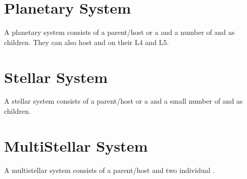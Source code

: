 \documentclass[letterpaper,10pt,english]{sphinxmanual}
\begin{document}
\section{Planetary System}
\label{\detokenize{celestial_systems/planetary_system:planetary-system}}\label{\detokenize{celestial_systems/planetary_system::doc}}\label{\detokenize{celestial_systems/planetary_system:id1}}
\sphinxAtStartPar
A planetary system consists of a parent/host {\hyperref[\detokenize{celestial_bodies/planet:id1}]{}} or
a {\hyperref[\detokenize{celestial_systems/binary_system:id1}]{}} and a number of
{\hyperref[\detokenize{celestial_bodies/satellite:id1}]{}} and {\hyperref[\detokenize{celestial_bodies/ring:id1}]{}} as children.
They can also host  {\hyperref[\detokenize{celestial_bodies/trojan:id1}]{}} and {\hyperref[\detokenize{celestial_bodies/trojan_satellite:id1}]{}}
on their {\hyperref[\detokenize{quantities/orbital/lagrange_position:id1}]{}} L4 and L5.


\section{Stellar System}
\label{\detokenize{celestial_systems/stellar_system:stellar-system}}\label{\detokenize{celestial_systems/stellar_system::doc}}\label{\detokenize{celestial_systems/stellar_system:id1}}
\sphinxAtStartPar
A stellar system consists of a parent/host {\hyperref[\detokenize{celestial_bodies/star:id1}]{}} or
a {\hyperref[\detokenize{celestial_systems/binary_system:id1}]{}} and a small number of
{\hyperref[\detokenize{celestial_systems/planetary_system:id1}]{}} and {\hyperref[\detokenize{celestial_bodies/asteroid_belt:id1}]{}} as children.


\section{Multi\sphinxhyphen{}Stellar System}
\label{\detokenize{celestial_systems/multi_stellar_system:multi-stellar-system}}\label{\detokenize{celestial_systems/multi_stellar_system::doc}}\label{\detokenize{celestial_systems/multi_stellar_system:id1}}
\sphinxAtStartPar
A multi\sphinxhyphen{}stellar system consists of a parent/host {\hyperref[\detokenize{celestial_systems/binary_system:id1}]{}}
and two individual {\hyperref[\detokenize{celestial_systems/stellar_system:id1}]{}}.
\end{document}
